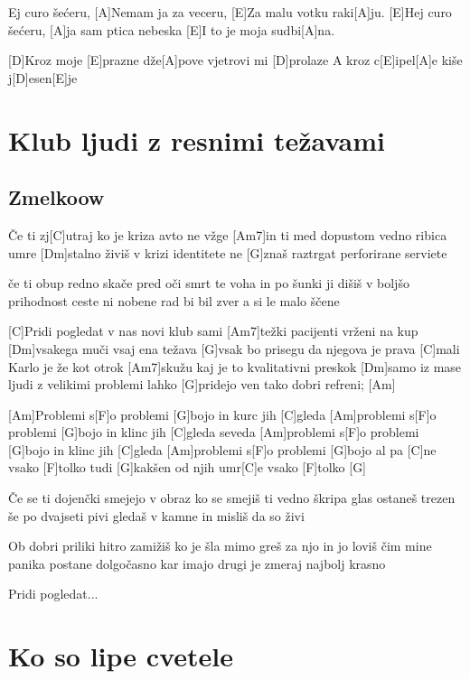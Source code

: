 \documentclass[a4paper,12pt]{article}
\begin{document}
\begin{multicols}{2}
\begin{guitar}
[E]Ej curo šećeru, 
[A]Nemam ja za veceru,
[E]Za malu votku raki[A]ju. 
[E]Hej curo šećeru, 
[A]ja sam ptica nebeska
[E]I to je moja sudbi[A]na.



[D]Kroz moje [E]prazne dže[A]pove 
vjetrovi mi [D]prolaze
A kroz c[E]ipel[A]e 
kiše j[D]esen[E]je

\end{guitar}
\section{Klub ljudi z resnimi težavami}
\subsection*{Zmelkoow}
\begin{guitar}
Če ti zj[C]utraj ko je kriza avto ne vžge 
[Am7]in ti med dopustom vedno ribica umre 
[Dm]stalno živiš v krizi identitete 
ne [G]znaš raztrgat perforirane serviete 


če ti obup redno skače pred oči
smrt te voha in po šunki ji dišiš 
v boljšo prihodnost ceste ni nobene 
rad bi bil zver a si le malo ščene 


[C]Pridi pogledat v nas novi klub
sami [Am7]težki pacijenti vrženi na kup 
[Dm]vsakega muči vsaj ena težava 
[G]vsak bo prisegu da njegova je prava 
[C]mali Karlo je že kot otrok 
[Am7]skužu kaj je to kvalitativni preskok 
[Dm]samo iz mase ljudi z velikimi problemi 
lahko [G]pridejo ven tako dobri refreni; [Am]


[Am]Problemi s[F]o problemi [G]bojo 
in kurc jih [C]gleda 
[Am]problemi s[F]o problemi [G]bojo 
in klinc jih [C]gleda seveda 
[Am]problemi s[F]o problemi [G]bojo 
in klinc jih [C]gleda 
[Am]problemi s[F]o problemi [G]bojo al pa [C]ne
vsako [F]tolko tudi [G]kakšen od njih umr[C]e 
vsako [F]tolko [G]


Če se ti dojenčki smejejo v obraz 
ko se smejiš ti vedno škripa glas 
ostaneš trezen še po dvajseti pivi 
gledaš v kamne in misliš da so živi 


Ob dobri priliki hitro zamižiš 
ko je šla mimo greš za njo in jo loviš 
čim mine panika postane dolgočasno 
kar imajo drugi je zmeraj najbolj krasno


Pridi pogledat...

\end{guitar}
\section{Ko so lipe cvetele}

\end{multicols}
\end{document}
